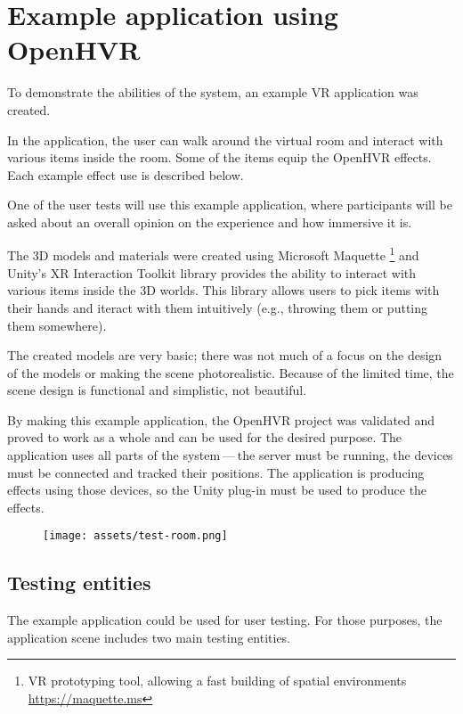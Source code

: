\chapter{Example application using OpenHVR}

To demonstrate the abilities of the system, an example VR application
was created.


In the application, the user can walk around the virtual room and interact with
various items inside the room. Some of the items equip the OpenHVR
effects. Each example effect use is described below.


One of the user tests will use this example application, where
participants will be asked about an overall opinion on the experience and
how immersive it is.


The 3D models and materials were created using Microsoft Maquette
\footnote{VR prototyping tool, allowing a fast building of spatial environments \href{https://maquette.ms}{https://maquette.ms}}
and Unity’s XR Interaction Toolkit library provides the ability to
interact with various items inside the 3D worlds. This library allows users to
pick items with their hands and iteract with them intuitively (e.g., throwing them
or putting them somewhere).


The created models are very basic; there was not much of a focus on the design
of the models or making the scene photorealistic. Because of the limited time,
the scene design is functional and simplistic, not beautiful.


By making this example application, the OpenHVR project was validated and proved
to work as a whole and can be used for the desired purpose. The application uses
all parts of the system — the server must be running, the devices must be
connected and tracked their positions. The application is producing effects
using those devices, so the Unity plug-in must be used to produce the effects.


\begin{figure}[h]{}
\centering\texttt{[image: assets/test-room.png]}
\caption{}

\end{figure}

\hypertarget{x-testing-entities}{\section{Testing entities}}
The example application could be used for user testing. For those purposes,
the application scene includes two main testing entities.


